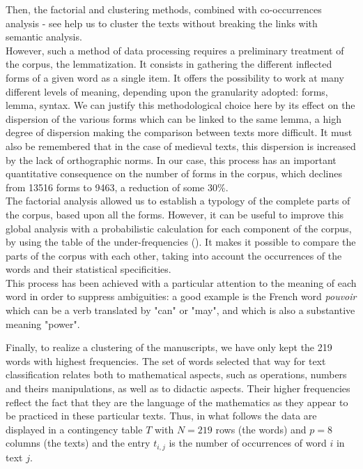 \documentclass{elsarticle}
\begin{document}
Then, the factorial and clustering methods, combined with co-occurrences analysis - see \cite{martinezcontribution2003} help us to cluster the texts without breaking the links with semantic analysis.\\

However, such a method of data processing requires a preliminary treatment of the corpus, the lemmatization. It consists in gathering the different inflected forms of a given word as a single item. It offers the possibility to work at many different levels of meaning, depending upon the granularity adopted: forms, lemma, syntax. We can justify this methodological choice here by its effect on the dispersion of the various forms which can be linked to the same lemma, a high degree of dispersion making the comparison between texts more difficult. It must also be remembered that in the case of medieval texts, this dispersion is increased by the lack of orthographic norms. In our case, this process has an important quantitative consequence on the number of forms in the corpus, which declines from 13516 forms to 9463, a reduction of some 30\%.\\

The factorial analysis allowed us to establish a typology of the complete parts of the corpus, based upon all the forms. However, it can be useful to improve this global analysis with a probabilistic calculation for each component of the corpus, by using the table of the under-frequencies (\cite{lebartstatistique1994}). It makes it possible to compare the parts of the corpus with each other, taking into account the occurrences of the words and their statistical specificities.\\

This process has been achieved with a particular attention to the meaning of each word in order to suppress ambiguities: a good example is the French word \textit{pouvoir} which can be a verb translated by "can" or "may", and which is also a substantive meaning "power".

Finally, to realize a clustering of the manuscripts, we have only kept the 219 words with highest frequencies. The set of words selected that way for text classification relates both to mathematical aspects, such as operations, numbers and theirs manipulations, as well as to didactic aspects. Their higher frequencies reflect the fact that they are the language of the mathematics as they appear to be practiced in these particular texts. Thus, in what follows the data are displayed in a contingency table $T$ with $N=219$ rows (the words) and $p=8$ columns (the texts) and the entry $t_{i,j}$ is the number of occurrences of word $i$ in text $j$.
\end{document}
